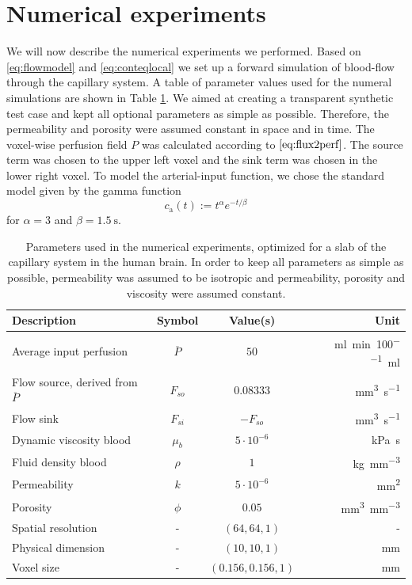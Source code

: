 \documentclass[paper=a4, fontsize=12pt,parskip=half,headings=small]{scrartcl}
\newcommand{\ca}{c_\mathrm{a}}
\newcommand{\siqt}{\cubic\milli\meter\per\second}
\newcommand{\sirho}{\kilo\gram\per\cubic\milli\meter}
\newcommand{\siPn}{\milli\litre\per\minute\per100\milli\litre}
\begin{document}
	\section{Numerical experiments}\label{sec:NumExp}

	We will now describe the numerical experiments we performed.
	Based on \eqref{eq:flowmodel} and \eqref{eq:conteqlocal} we set up a forward simulation of blood-flow through the capillary system.
	A table of parameter values used for the numeral simulations are shown in Table \ref{tab:par}. 
	We aimed at creating a transparent synthetic test case and kept all optional parameters as simple as possible. 
	Therefore, the permeability and porosity were assumed constant in space and in time.
	The voxel-wise perfusion field $P$ was calculated according to $\eqref{eq:flux2perf}$. 
	The source term was chosen to the upper left voxel and the sink term was chosen in the lower right voxel.
	To model the arterial-input function, we chose the standard model \cite{wu03} given by the gamma function
	\[
		\ca(t) := t^\alpha e^{-t/\beta}
	\]
	for $\alpha=3$ and $\beta = \SI{1.5}{\second}$.
	
	\begin{table}[H]
		\centering
	  \caption{Parameters used in the numerical experiments, optimized for a slab of the capillary system in the human brain. In order to keep all parameters as simple as possible, permeability was assumed to be isotropic and permeability, porosity and viscosity were assumed constant.}		
		\begin{tabular}{ l  c  c  r }
		    Description 									& Symbol 			& Value(s) 				& Unit 				\\
			\toprule
		    Average input perfusion 				 		& $\overline{P}$ 	& $50$ 					& \si{\siPn}		\\
			Flow source, derived from $\overline{P}$ 		& $F_{so}$ 			& $0.08333$ 			& \si{\siqt}  		\\
			Flow sink 										& $F_{si}$ 			& $-F_{so}$ 		 	& \si{\siqt}  		\\
			Dynamic viscosity blood \cite{rosencranz06} 	& $\mu_b$ 			& $5 \cdot 10^{-6}$ 	& \si{\kilo\pascal\second}  	\\
			Fluid density blood \cite{kenner89} 			& $\rho$ 			& $1 $ 					& \si{\sirho} 		\\		
			Permeability  									& $k$ 				& $5 \cdot 10^{-6}$ 	& \si{\square\milli\meter} 			\\	
			Porosity\cite{wu03}								& $\phi$ 			& $0.05$ 				& \si{\cubic\milli\meter\per\cubic\milli\meter	}	\\	
			Spatial resolution 								& - 				& $(64,64,1)$ 			& -					\\
			Physical dimension 								& - 				& $(10,10,1)$ 			& \si{\milli\meter}				\\
			Voxel size 										& - 				& $(0.156,0.156,1)$ 	& \si{\milli\meter}	\\
	  \end{tabular}
	  \label{tab:par}
	\end{table}	
	
\end{document}
